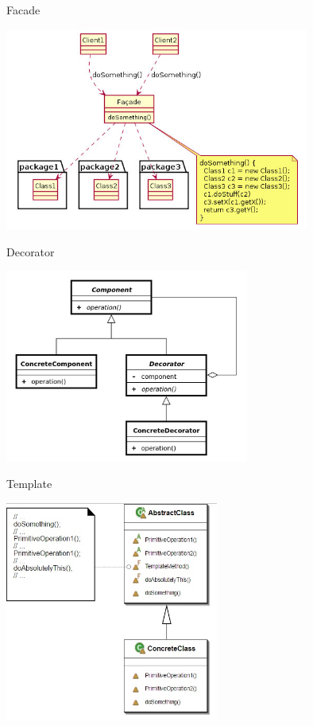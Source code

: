 \begin{frame}{Facade}
	\begin{center}
		\includegraphics[width=10cm]{pattern_facade.jpg}
	\end{center}
\end{frame}

\begin{frame}{Decorator}
	\begin{center}
		\includegraphics[width=8cm]{pattern_decorator.jpg}
	\end{center}
\end{frame}

\begin{frame}{Template}
	\begin{center}
		\includegraphics[width=7cm]{pattern_template.jpg}
	\end{center}
\end{frame}

